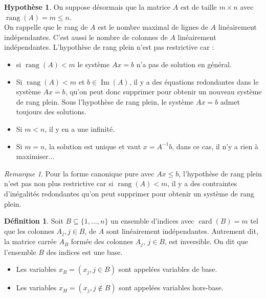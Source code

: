 \documentclass[a4paper,12pt,openany]{book}
\theoremstyle{plain}
\theoremstyle{definition}
\newtheorem{definition}[theorem]{Définition}
\newtheorem{hypothese}[theorem]{Hypothèse}
\theoremstyle{remark}
\newtheorem{remarque}[theorem]{Remarque}
\theoremstyle{nbstyle}
\begin{document}
	\begin{hypothese}
		On suppose désormais que la matrice $A$ est de taille $m \times n$ avec $\operatorname{rang}(A)=m \leq n$.\\
		On rappelle que le rang de $A$ est le nombre maximal de lignes de $A$ linéairement indépendantes. C'est aussi le nombre de colonnes de $A$ linéairement indépendantes. L'hypothèse de rang plein n'est pas restrictive car :
	\end{hypothese}
	
	\begin{itemize}
		\item si $\operatorname{rang}(A)<m$ le système $A x=b$ n'a pas de solution en général.
		\item Si $\operatorname{rang}(A)<m$ et $b \in \operatorname{Im}(A)$, il y a des équations redondantes dans le système $A x=b$, qu'on peut donc supprimer pour obtenir un nouveau système de rang plein. Sous l'hypothèse de rang plein, le système $A x=b$ admet toujours des solutions.
		\item Si $m<n$, il y en a une infinité.
		\item Si $m=n$, la solution est unique et vaut $x=A^{-1} b$, dans ce cas, il n'y a rien à maximiser...
	\end{itemize}
	
	\begin{remarque}
		Pour la forme canonique pure avec $A x \leq b$, l'hypothèse de rang plein n'est pas non plus restrictive car si $\operatorname{rang}(A)<m$, il y a des contraintes d'inégalités redondantes qu'on peut supprimer pour obtenir un système de rang plein.
	\end{remarque}
	\label{rem:2.1}
	
	\begin{definition}
		Soit $B \subseteq\{1, \ldots, n\}$ un ensemble d'indices avec $\operatorname{card}(B)=m$ tel que les colonnes $A_{j}, j \in B$, de $A$ sont linéairement indépendantes. Autrement dit, la matrice carrée $A_{B}$ formée des colonnes $A_{j}$, $j \in B$, est inversible. On dit que l'ensemble $B$ des indices est une base.
	\end{definition}
	\label{def:2.2}
	
	\begin{itemize}
		\item Les variables $x_{B}=\left(x_{j}, j \in B\right)$ sont appelées variables de base.
		\item Les variables $x_{H}=\left(x_{j}, j \notin B\right)$ sont appelées variables hors-base.
	\end{itemize}
	
\end{document}
